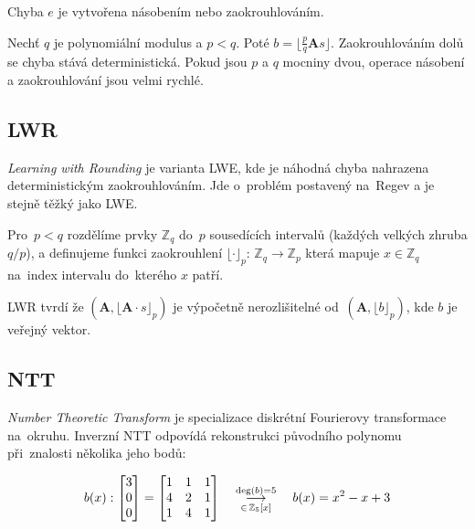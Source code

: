 Chyba $e$ je vytvořena násobením nebo zaokrouhlováním.

Nechť $q$ je polynomiální modulus a $p < q$.
Poté $b = \lfloor \frac{p}{q} \textbf{A}s \rfloor$.
Zaokrouhlováním dolů se chyba stává deterministická.
Pokud jsou $p$ a $q$ mocniny dvou, operace násobení a zaokrouhlování jsou velmi rychlé.


\subsection{LWR}

\emph{Learning with Rounding} je varianta LWE, kde je náhodná chyba nahrazena deterministickým zaokrouhlováním.
Jde o~problém postavený na~Regev a je stejně těžký jako LWE.

Pro~$p < q$ rozdělíme prvky $\mathbb{Z}_q$ do~$p$ sousedících intervalů (každých velkých zhruba $q/p$), a definujeme funkci zaokrouhlení $\lfloor \cdot \rfloor_p$: $\mathbb{Z}_q \rightarrow \mathbb{Z}_p$ která mapuje $x \in \mathbb{Z}_q$ na~index intervalu do~kterého $x$ patří.

LWR tvrdí že $(\textbf{A}, \lfloor \textbf{A} \cdot s \rfloor_p)$ je výpočetně nerozlišitelné od~$(\textbf{A}, \lfloor b \rfloor_p)$, kde $b$ je veřejný vektor.


\subsection{NTT}
\label{sec:ntt}

\emph{Number Theoretic Transform} je specializace diskrétní Fourierovy transformace na~okruhu.
Inverzní NTT odpovídá rekonstrukci původního polynomu při~znalosti několika jeho bodů:

$$
b(x):
\left[\begin{matrix}
3 \\ 0 \\ 0
\end{matrix}\right] = \left[\begin{matrix}
1 & 1 & 1 \\ 4 & 2 & 1 \\ 1 & 4 & 1 \\
\end{matrix}\right]
\hspace*{1em}
\mathrel{\mathop{\longrightarrow}^{\text{deg}(b)=5}_{\in \, \mathbb{Z}_5[x]}}
\hspace*{1em}
b(x) = x^2 - x + 3
$$

